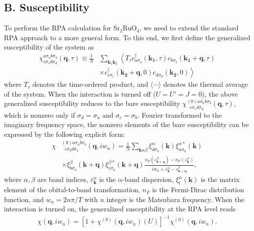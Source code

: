 \documentclass[aps,prl,twocolumn,superscriptaddress,showpacs]{revtex4-1}
\begin{document}
\subsection{B. Susceptibility}
To perform the RPA calculation for Sr$_2$RuO$_4$, we need to extend the standard RPA approach \cite{RPA1,RPA2,RPA3,Kuroki,Scalapino1,Scalapino2,Liu2013,Wu2014,Ma2014,Zhang2015} to a more general form. To this end, we first define the generalized susceptibility of the system as
\begin{align}
\chi^{a\sigma_ab\sigma_b}
_{c\sigma_cd\sigma_d}(\bm{q},\tau)
\equiv\frac{1}{N}&\sum_{\bm{k}_1\bm{k}_2}
\left\langle T_{\tau}c^{\dagger}_{a\sigma_a}(\bm{k_1},\tau)
c_{b\sigma_b}(\bm{k_1}+\bm{q},\tau)\right.                      \nonumber\\
&\left.\times c^{\dagger}_{c\sigma_c}(\bm{k_2}+\bm{q},0)
c_{d\sigma_d}(\bm{k_2},0)\right\rangle
\end{align}
where $T_{\tau}$ denotes the time-ordered product, and $\langle\cdots\rangle$ denotes the thermal average of the system. When the interaction is turned off ($U=U'=J=0$), the above generalized susceptibility reduces to the bare susceptibility $\chi^{(0)a\sigma_ab\sigma_b}
_{~~~c\sigma_cd\sigma_d}(\bm{q},\tau)$, which is nonzero only if $\sigma_d=\sigma_a$ and $\sigma_c=\sigma_b$. Fourier transformed to the imaginary frequency space, the nonzero elements of the bare susceptibility can be expressed by the following explicit form:
\begin{align}
\chi&^{(0)a\sigma_ab\sigma_b}
_{~~~c\sigma_bd\sigma_a}(\bm{q},iw_n)
=\frac{1}{N}\sum_{\bm{k}\alpha\beta}
\xi^{\alpha}_{d\sigma_a}(\bm{k})
\xi^{\alpha*}_{a\sigma_a}(\bm{k})                      \nonumber\\
&\times \xi^{\beta}_{b\sigma_b}(\bm{k}+\bm{q})
\xi^{\beta*}_{c\sigma_b}(\bm{k}+\bm{q})
\frac{n_F(\varepsilon^{\beta}_{\bm{k}+\bm{q}})
-n_F(\varepsilon^{\alpha}_{\bm{k}})}
{iw_n+\varepsilon^{\alpha}_{\bm{k}}
-\varepsilon^{\beta}_{\bm{k}+\bm{q}}},
\label{eq:chi0}
\end{align}
where $\alpha,\beta$ are band indices, $\varepsilon^{\alpha}_{\bm{k}}$ is the $\alpha$-band dispersion, $\xi^{\alpha}_{l}\left(\bm{k}\right)$ is the matrix element of the obital-to-band transformation, $n_F$ is the Fermi-Dirac distribution function, and $w_n = 2n\pi/T$ with $n$ integer is the Matsubara frequency. When the interaction is turned on, the generalized susceptibility at the RPA level reads
\begin{align}\label{RPA}
\chi(\bm{q},iw_n)=\left[1+\chi^{(0)}(\bm{q},iw_n)(U)\right]^{-1}
\chi^{(0)}(\bm{q},iw_n).
\end{align}
\end{document}
